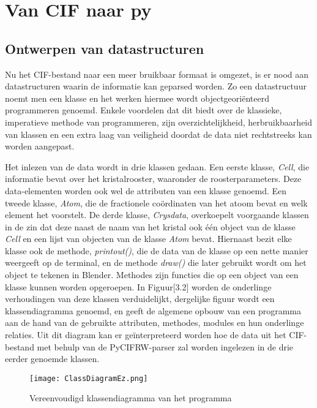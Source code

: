 \section{Van CIF naar py}

\subsection{Ontwerpen van datastructuren}
Nu het CIF-bestand naar een meer bruikbaar formaat is omgezet, is er nood aan datastructuren waarin de informatie kan geparsed worden. Zo een datastructuur noemt men een klasse en het werken hiermee wordt objectgeoriënteerd programmeren genoemd. Enkele voordelen dat dit biedt over de klassieke, imperatieve methode van programmeren, zijn overzichtelijkheid, herbruikbaarheid van klassen en een extra laag van veiligheid doordat de data niet rechtstreeks kan worden aangepast.
\par
Het inlezen van de data wordt in drie klassen gedaan. Een eerste klasse, \textit{Cell}, die informatie bevat over het kristalrooster, waaronder de roosterparameters. Deze data-elementen worden ook wel de attributen van een klasse genoemd. Een tweede klasse, \textit{Atom}, die de fractionele coördinaten van het atoom bevat en welk element het voorstelt. De derde klasse, \textit{Crysdata}, overkoepelt voorgaande klassen in de zin dat deze naast de naam van het kristal ook één object van de klasse \textit{Cell} en een lijst van objecten van de klasse \textit{Atom} bevat. Hiernaast bezit elke klasse ook de methode, \textit{printout()}, die de data van de klasse op een nette manier weergeeft op de terminal, en de methode \textit{draw()} die later gebruikt wordt om het object te tekenen in Blender. Methodes zijn functies die op een object van een klasse kunnen worden opgeroepen.  In Figuur[3.2] worden de onderlinge verhoudingen van deze klassen verduidelijkt, dergelijke figuur wordt een klassendiagramma genoemd, en geeft de algemene opbouw van een programma aan de hand van de gebruikte attributen, methodes, modules en hun onderlinge relaties. Uit dit diagram kan er geïnterpreteerd worden hoe de data uit het CIF-bestand met behulp van de PyCIFRW-parser zal worden ingelezen in de drie eerder genoemde klassen.

\begin{figure}[h]
\texttt{[image: ClassDiagramEz.png]}
\caption{Vereenvoudigd klassendiagramma van het programma}
\end{figure}

